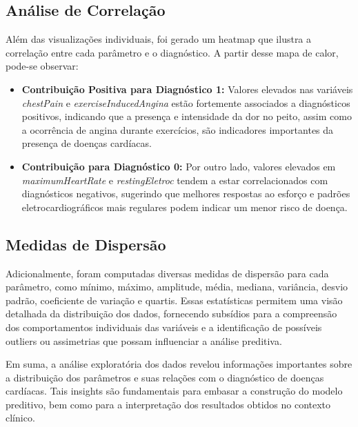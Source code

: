 \documentclass[conference]{IEEEtran}
\begin{document}
\subsection{Análise de Correlação}
Além das visualizações individuais, foi gerado um heatmap que ilustra a correlação entre cada parâmetro e o diagnóstico. A partir desse mapa de calor, pode-se observar:
\begin{itemize}
    \begin{figure}[htbp]
        \centering
        \texttt{[image: imagens/heatmap.png]}
        \caption{Heatmap de correlação entre variáveis}
        \label{heatmap}
    \end{figure}    
    \item \textbf{Contribuição Positiva para Diagnóstico 1:} Valores elevados nas variáveis \textit{chestPain} e \textit{exerciseInducedAngina} estão fortemente associados a diagnósticos positivos, indicando que a presença e intensidade da dor no peito, assim como a ocorrência de angina durante exercícios, são indicadores importantes da presença de doenças cardíacas.
    \item \textbf{Contribuição para Diagnóstico 0:} Por outro lado, valores elevados em \textit{maximumHeartRate} e \textit{restingEletroc} tendem a estar correlacionados com diagnósticos negativos, sugerindo que melhores respostas ao esforço e padrões eletrocardiográficos mais regulares podem indicar um menor risco de doença.
\end{itemize}

\subsection{Medidas de Dispersão}
Adicionalmente, foram computadas diversas medidas de dispersão para cada parâmetro, como mínimo, máximo, amplitude, média, mediana, variância, desvio padrão, coeficiente de variação e quartis. Essas estatísticas permitem uma visão detalhada da distribuição dos dados, fornecendo subsídios para a compreensão dos comportamentos individuais das variáveis e a identificação de possíveis outliers ou assimetrias que possam influenciar a análise preditiva.

Em suma, a análise exploratória dos dados revelou informações importantes sobre a distribuição dos parâmetros e suas relações com o diagnóstico de doenças cardíacas. Tais insights são fundamentais para embasar a construção do modelo preditivo, bem como para a interpretação dos resultados obtidos no contexto clínico.
\end{document}
